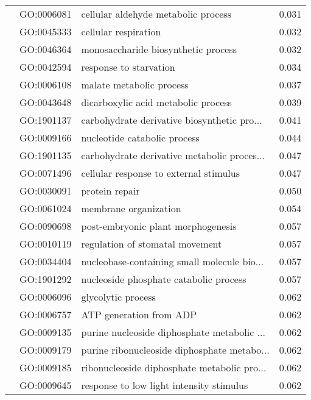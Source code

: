 \begin{longtable}{lllr}
   & GO:0006081 &          cellular aldehyde metabolic process &         0.031 \\
   & GO:0045333 &                         cellular respiration &         0.032 \\
   & GO:0046364 &          monosaccharide biosynthetic process &         0.032 \\
   & GO:0042594 &                       response to starvation &         0.034 \\
   & GO:0006108 &                     malate metabolic process &         0.037 \\
   & GO:0043648 &          dicarboxylic acid metabolic process &         0.039 \\
   & GO:1901137 &  carbohydrate derivative biosynthetic pro... &         0.041 \\
   & GO:0009166 &                 nucleotide catabolic process &         0.044 \\
   & GO:1901135 &  carbohydrate derivative metabolic proces... &         0.047 \\
   & GO:0071496 &       cellular response to external stimulus &         0.047 \\
   & GO:0030091 &                               protein repair &         0.050 \\
   & GO:0061024 &                        membrane organization &         0.054 \\
   & GO:0090698 &           post-embryonic plant morphogenesis &         0.057 \\
   & GO:0010119 &              regulation of stomatal movement &         0.057 \\
   & GO:0034404 &  nucleobase-containing small molecule bio... &         0.057 \\
   & GO:1901292 &       nucleoside phosphate catabolic process &         0.057 \\
   & GO:0006096 &                           glycolytic process &         0.062 \\
   & GO:0006757 &                      ATP generation from ADP &         0.062 \\
   & GO:0009135 &  purine nucleoside diphosphate metabolic ... &         0.062 \\
   & GO:0009179 &  purine ribonucleoside diphosphate metabo... &         0.062 \\
   & GO:0009185 &  ribonucleoside diphosphate metabolic pro... &         0.062 \\
   & GO:0009645 &     response to low light intensity stimulus &         0.062 \\

\end{longtable}
